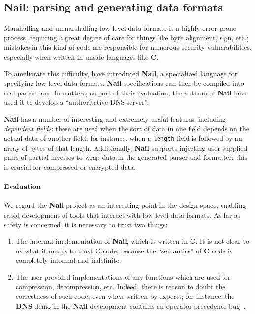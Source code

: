\documentclass{article}
\newcommand\Kwd[1]{{\sffamily\bfseries{#1}}}
\begin{document}
\subsection*{Nail: parsing and generating data formats}

Marshalling and unmarshalling low-level data formats
is a highly error-prone process, requiring a great degree of care for
things like byte alignment, sign, etc.; mistakes in this kind of code
are responsible for numerous security vulnerabilities, especially when
written in unsafe languages like \Kwd{C}.

To ameliorate this difficulty, \citeauthor{bangert:2014} have
introduced \Kwd{Nail}, a specialized language for specifying low-level
data formats. \Kwd{Nail} specifications can then be compiled into real
parsers and formatters; as part of their evaluation, the authors of
\Kwd{Nail} have used it to develop a ``authoritative DNS server''.

\Kwd{Nail} has a number of interesting and extremely useful features,
including \emph{dependent fields}: these are used when the sort of
data in one field depends on the actual data of another field: for
instance, when a \verb|length| field is followed by an array of bytes
of that length.
%
Additionally, \Kwd{Nail} supports injecting user-supplied pairs of
partial inverses to wrap data in the generated parser and formatter;
this is crucial for compressed or encrypted data.

\paragraph{Evaluation}

We regard the \Kwd{Nail} project as an interesting point in the design
space, enabling rapid development of tools that interact with
low-level data formats. As far as safety is concerned, it is necessary
to trust two things:

\begin{enumerate}
\item The internal implementation of \Kwd{Nail}, which is written in
  \Kwd{C}. It is not clear to us what it means to trust \Kwd{C} code,
  because the ``semantics'' of \Kwd{C} code is completely informal and
  indefinite.
\item The user-provided implementations of any functions which are
  used for compression, decompression, etc. Indeed, there is reason to
  doubt the correctness of such code, even when written by experts;
  for instance, the \Kwd{DNS} demo in the \Kwd{Nail} development
  contains an operator precedence bug~\citep{nigeltao:ticket}.
\end{enumerate}
\end{document}
